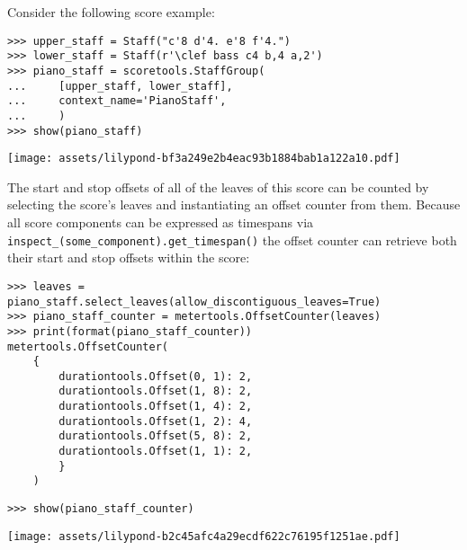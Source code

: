 Consider the following score example:

\begin{comment}
<abjad>
upper_staff = Staff("c'8 d'4. e'8 f'4.")
lower_staff = Staff(r'\clef bass c4 b,4 a,2')
piano_staff = scoretools.StaffGroup(
    [upper_staff, lower_staff],
    context_name='PianoStaff',
    )
show(piano_staff)
</abjad>
\end{comment}

\begin{abjadbookoutput}
\begin{singlespacing}
\vspace{-0.5\baselineskip}
\begin{verbatim}
>>> upper_staff = Staff("c'8 d'4. e'8 f'4.")
>>> lower_staff = Staff(r'\clef bass c4 b,4 a,2')
>>> piano_staff = scoretools.StaffGroup(
...     [upper_staff, lower_staff],
...     context_name='PianoStaff',
...     )
>>> show(piano_staff)
\end{verbatim}
\noindent\texttt{[image: assets/lilypond-bf3a249e2b4eac93b1884bab1a122a10.pdf]}
\end{singlespacing}
\end{abjadbookoutput}

\noindent The start and stop offsets of all of the leaves of this score can be
counted by selecting the score's leaves and instantiating an offset counter
from them. Because all score components can be expressed as timespans via
\texttt{inspect\_(some\_component).get\_timespan()} the offset counter can
retrieve both their start and stop offsets within the score:

\begin{comment}
<abjad>
leaves = piano_staff.select_leaves(allow_discontiguous_leaves=True)
piano_staff_counter = metertools.OffsetCounter(leaves)
print(format(piano_staff_counter))
show(piano_staff_counter)
</abjad>
\end{comment}

\begin{abjadbookoutput}
\begin{singlespacing}
\vspace{-0.5\baselineskip}
\begin{verbatim}
>>> leaves = piano_staff.select_leaves(allow_discontiguous_leaves=True)
>>> piano_staff_counter = metertools.OffsetCounter(leaves)
>>> print(format(piano_staff_counter))
metertools.OffsetCounter(
    {
        durationtools.Offset(0, 1): 2,
        durationtools.Offset(1, 8): 2,
        durationtools.Offset(1, 4): 2,
        durationtools.Offset(1, 2): 4,
        durationtools.Offset(5, 8): 2,
        durationtools.Offset(1, 1): 2,
        }
    )
\end{verbatim}
\begin{verbatim}
>>> show(piano_staff_counter)
\end{verbatim}
\noindent\texttt{[image: assets/lilypond-b2c45afc4a29ecdf622c76195f1251ae.pdf]}
\end{singlespacing}
\end{abjadbookoutput}

